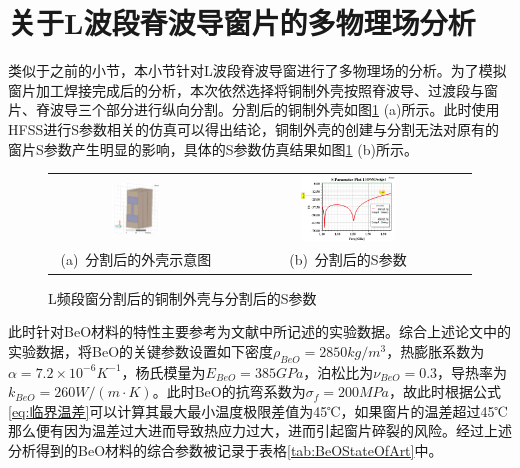 \documentclass[master]{thesis-uestc}
\begin{document}
\section{关于L波段脊波导窗片的多物理场分析}
类似于之前的小节，本小节针对L波段脊波导窗进行了多物理场的分析。为了模拟窗片加工焊接完成后的分析，本次依然选择将铜制外壳按照脊波导、过渡段与窗片、脊波导三个部分进行纵向分割。分割后的铜制外壳如图\ref{fig:L分割后的铜制外壳} (a)所示。此时使用HFSS进行S参数相关的仿真可以得出结论，铜制外壳的创建与分割无法对原有的窗片S参数产生明显的影响，具体的S参数仿真结果如图\ref{fig:L分割后的铜制外壳} (b)所示。
\begin{figure}[!htb]
    \small
    \centering
    \begin{tabular}{@{\ }c@{\ }c}
        \includegraphics[width=0.3\textwidth]{pic/chapter4/L频段分割后的铜制外壳.png} & 
        \hspace{5pt}
        \includegraphics[width=0.4\textwidth]{pic/chapter4/L频段分割铜制外壳后的S曲线.png}     \\
        \mbox{\small (a) 分割后的外壳示意图}                                                                               & 
        \mbox{\small (b) 分割后的S参数}                                                                                  \\
    \end{tabular}
    \caption{L频段窗分割后的铜制外壳与分割后的S参数}
    \label{fig:L分割后的铜制外壳}
\end{figure}

此时针对BeO材料的特性主要参考为文献\cite{thumm_stateart_2020, slack_thermal_1971,kozlovskii_thermal_2014}中所记述的实验数据。综合上述论文中的实验数据，将BeO的关键参数设置如下密度\(\rho_{BeO} = 2850kg/m^3\)，热膨胀系数为\(\alpha = 7.2 \times 10^{-6} K^{-1}\)，杨氏模量为\(E_{BeO} = 385GPa\)，泊松比为\(\nu_{BeO} = 0.3\)，导热率为\(k_{BeO} = 260 W/(m \cdot K)\)。此时BeO的抗弯系数为$\sigma_f = 200MPa$，故此时根据公式\ref{eq:临界温差}可以计算其最大最小温度极限差值为45℃，如果窗片的温差超过45℃那么便有因为温差过大进而导致热应力过大，进而引起窗片碎裂的风险。经过上述分析得到的BeO材料的综合参数被记录于表格\ref{tab:BeOStateOfArt}中。
\end{document}
